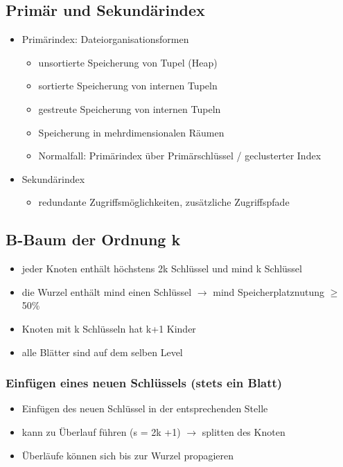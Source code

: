 \documentclass[a4paper]{article}
\begin{document}
\subsection{Primär und Sekundärindex}
\begin{itemize}
    \item Primärindex: Dateiorganisationsformen
    
    \begin{itemize}
        \item unsortierte Speicherung von Tupel (Heap)
        \item sortierte Speicherung von internen Tupeln
        \item gestreute Speicherung von internen Tupeln
        \item Speicherung in mehrdimensionalen Räumen
        \item Normalfall: Primärindex über Primärschlüssel / geclusterter Index
    \end{itemize}
    
    \item Sekundärindex
    
    \begin{itemize}
        \item redundante Zugriffsmöglichkeiten, zusätzliche Zugriffspfade
    \end{itemize}
\end{itemize}

\subsection{B-Baum der Ordnung k}
\begin{itemize}
    \item jeder Knoten enthält höchstens 2k Schlüssel und mind k Schlüssel
    \item die Wurzel enthält mind einen Schlüssel $\to$ mind Speicherplatznutung $\ge$ 50\%
    \item Knoten mit k Schlüsseln hat k+1 Kinder
    \item alle Blätter sind auf dem selben Level
\end{itemize}

    \subsubsection{Einfügen eines neuen Schlüssels (stets ein Blatt)}
    \begin{itemize}
        \item Einfügen des neuen Schlüssel in der entsprechenden Stelle
        \item kann zu Überlauf führen (s = 2k +1) $\to$ splitten des Knoten
        \item Überläufe können sich bis zur Wurzel propagieren
    \end{itemize}
    
\end{document}
